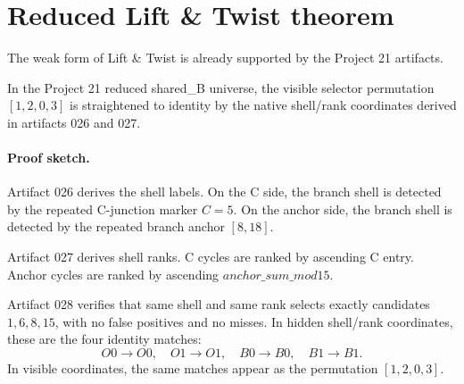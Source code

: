 \section{Reduced Lift \& Twist theorem}

The weak form of Lift \& Twist is already supported by the Project 21 artifacts.

\begin{theorem}
In the Project 21 reduced shared\_B universe, the visible selector permutation \([1,2,0,3]\) is straightened to identity by the native shell/rank coordinates derived in artifacts 026 and 027.
\end{theorem}

\paragraph{Proof sketch.}
Artifact 026 derives the shell labels.  On the C side, the branch shell is detected by the repeated C-junction marker \(C=5\).  On the anchor side, the branch shell is detected by the repeated branch anchor \([8,18]\).

Artifact 027 derives shell ranks.  C cycles are ranked by ascending C entry.  Anchor cycles are ranked by ascending \(anchor\_sum\_mod15\).

Artifact 028 verifies that same shell and same rank selects exactly candidates \(1,6,8,15\), with no false positives and no misses.  In hidden shell/rank coordinates, these are the four identity matches:
\[
    O0\to O0,\quad
    O1\to O1,\quad
    B0\to B0,\quad
    B1\to B1.
\]
In visible coordinates, the same matches appear as the permutation \([1,2,0,3]\).
